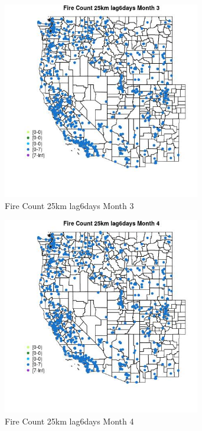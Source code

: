 \begin{figure} 
\centering  
\includegraphics[width=0.77\textwidth]{Code_Outputs/Report_ML_input_PM25_Step4_part_e_de_duplicated_aves_compiled_2019-05-21wNAs_MapObsMo3Fire_Count_25km_lag6days.jpg} 
\caption{\label{fig:Report_ML_input_PM25_Step4_part_e_de_duplicated_aves_compiled_2019-05-21wNAsMapObsMo3Fire_Count_25km_lag6days}Fire Count 25km lag6days Month 3} 
\end{figure} 
 

\begin{figure} 
\centering  
\includegraphics[width=0.77\textwidth]{Code_Outputs/Report_ML_input_PM25_Step4_part_e_de_duplicated_aves_compiled_2019-05-21wNAs_MapObsMo4Fire_Count_25km_lag6days.jpg} 
\caption{\label{fig:Report_ML_input_PM25_Step4_part_e_de_duplicated_aves_compiled_2019-05-21wNAsMapObsMo4Fire_Count_25km_lag6days}Fire Count 25km lag6days Month 4} 
\end{figure} 
 

